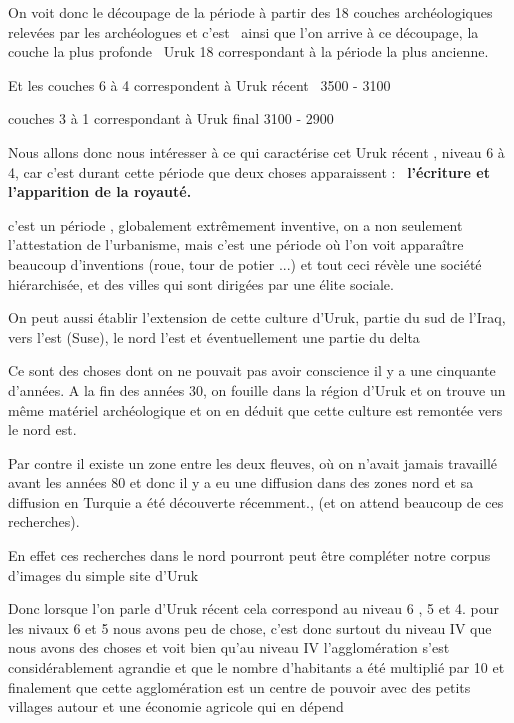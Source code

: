 \documentclass[a4paper]{article}
\begin{document}
{
On voit donc le découpage de la période à partir des 18 couches archéologiques relevées par les archéologues et c'est
\ ainsi que l'on arrive à ce découpage, la couche la plus profonde \ Uruk 18 correspondant à la période la plus
ancienne.}


\bigskip

{
Et les couches 6 à 4 correspondent à Uruk récent \ 3500 - 3100}

{
couches 3 à 1 correspondant à Uruk final 3100 - 2900 }


\bigskip


\bigskip

{
Nous allons donc nous intéresser à ce qui caractérise cet Uruk récent , niveau 6 à 4, car c'est durant cette période que
deux choses apparaissent : \ \textbf{l'écriture et l'apparition de la royauté.}}


\bigskip

{
c'est un période , globalement extrêmement inventive, on a non seulement l'attestation de l'urbanisme, mais c'est une
période où l'on voit apparaître beaucoup d'inventions (roue, tour de potier ...) et tout ceci révèle une société
hiérarchisée, et des villes qui sont dirigées par une élite sociale.}


\bigskip

{
On peut aussi établir l'extension de cette culture d'Uruk, partie du sud de l'Iraq, vers l'est (Suse), le nord l'est et
éventuellement une partie du delta}


\bigskip

{
Ce sont des choses dont on ne pouvait pas avoir conscience il y a une cinquante d'années. A la fin des années 30, on
fouille dans la région d'Uruk et on trouve un même matériel archéologique et on en déduit que cette culture est
remontée vers le nord est. }

{
Par contre il existe un zone entre les deux fleuves, où on n'avait jamais travaillé avant les années 80 et donc il y a
eu une diffusion dans des zones nord et sa diffusion en Turquie a été découverte récemment., (et on attend beaucoup de
ces recherches).}

{
En effet ces recherches dans le nord pourront peut être compléter notre corpus d'images du simple site d'Uruk}


\bigskip

{
Donc lorsque l'on parle d'Uruk récent cela correspond au niveau 6 , 5 et 4. pour les nivaux 6 et 5 nous avons peu de
chose, c'est donc surtout du niveau IV que nous avons des choses et voit bien qu'au niveau IV l'agglomération s'est
considérablement agrandie et que le nombre d'habitants a été multiplié par 10 et finalement que cette agglomération est
un centre de pouvoir avec des petits villages autour et une économie agricole qui en dépend}
\end{document}

